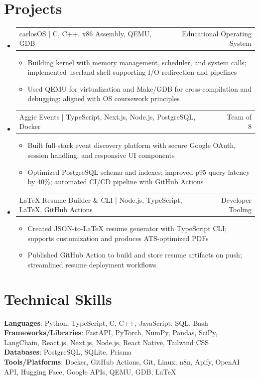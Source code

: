 \documentclass[letterpaper,11pt]{article}
\makeatletter
\newcommand{\resumeItem}[1]{
  \item\small{{#1 \vspace{-2pt}}}
}
\newcommand{\resumeProjectHeading}[2]{
    \item
    \begin{tabular*}{0.97\textwidth}{l@{\extracolsep{\fill}}r}
      \small#1 & #2 \\
    \end{tabular*}\vspace{-7pt}
}
\newcommand{\resumeSubHeadingListStart}{\begin{itemize}[leftmargin=0.15in, label={}]}
\newcommand{\resumeSubHeadingListEnd}{\end{itemize}}
\newcommand{\resumeItemListStart}{\begin{itemize}}
\newcommand{\resumeItemListEnd}{\end{itemize}\vspace{-5pt}}
\makeatother
\begin{document}
\section{Projects}
\resumeSubHeadingListStart
  \resumeProjectHeading
    {carlosOS | C, C++, x86 Assembly, QEMU, GDB}{Educational Operating System}
    \resumeItemListStart
      \resumeItem{Building kernel with memory management, scheduler, and system calls; implemented userland shell supporting I/O redirection and pipelines}
      \resumeItem{Used QEMU for virtualization and Make/GDB for cross-compilation and debugging; aligned with OS coursework principles}
    \resumeItemListEnd

  \resumeProjectHeading
    {Aggie Events | TypeScript, Next.js, Node.js, PostgreSQL, Docker}{Team of 8}
    \resumeItemListStart
      \resumeItem{Built full-stack event discovery platform with secure Google OAuth, session handling, and responsive UI components}
      \resumeItem{Optimized PostgreSQL schema and indexes; improved p95 query latency by 40\%; automated CI/CD pipeline with GitHub Actions}
    \resumeItemListEnd

  \resumeProjectHeading
    {LaTeX Resume Builder \& CLI | Node.js, TypeScript, LaTeX, GitHub Actions}{Developer Tooling}
    \resumeItemListStart
      \resumeItem{Created JSON-to-LaTeX resume generator with TypeScript CLI; supports customization and produces ATS-optimized PDFs}
      \resumeItem{Published GitHub Action to build and store resume artifacts on push; streamlined resume deployment workflows}
    \resumeItemListEnd
\resumeSubHeadingListEnd

\section{Technical Skills}
\begin{itemize}[leftmargin=0.15in, label={}]
  \small{\item{
    \textbf{Languages}{: Python, TypeScript, C, C++, JavaScript, SQL, Bash} \\
    \textbf{Frameworks/Libraries}{: FastAPI, PyTorch, NumPy, Pandas, SciPy, LangChain, React.js, Next.js, Node.js, React Native, Tailwind CSS} \\
    \textbf{Databases}{: PostgreSQL, SQLite, Prisma} \\
    \textbf{Tools/Platforms}{: Docker, GitHub Actions, Git, Linux, n8n, Apify, OpenAI API, Hugging Face, Google APIs, QEMU, GDB, LaTeX}
  }}
\end{itemize}
\end{document}
